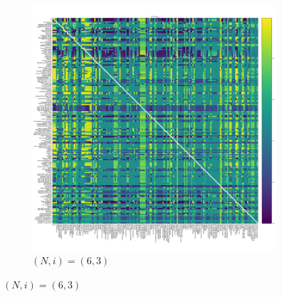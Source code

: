\documentclass{article}
\begin{document}
\begin{figure}[!hbtp]
    ~
    \begin{subfigure}[t]{.3\textwidth}
        \centering
        \includegraphics[width=.8\textwidth]{../img/fixation_heatmap_6_coexist.pdf}
        \caption{\((N,i)=(6, 3)\)}
    \end{subfigure}%


\end{figure}
\end{document}
